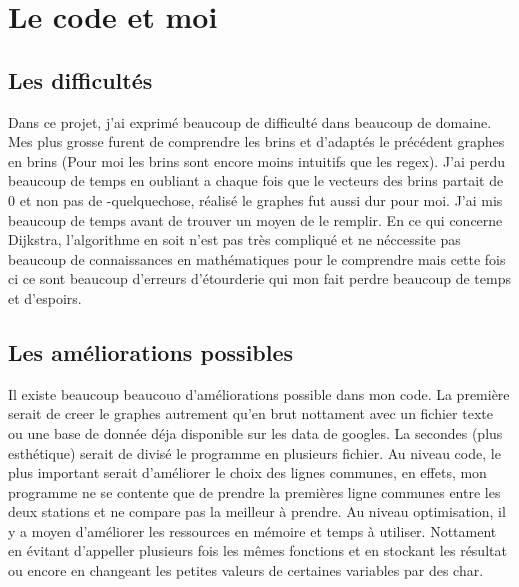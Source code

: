 \section{Le code et moi}
\subsection{Les difficultés}
Dans ce projet, j'ai exprimé beaucoup de difficulté dans beaucoup de domaine. Mes plus grosse furent de comprendre les brins et d'adaptés le précédent graphes en brins (Pour moi les brins sont encore moins intuitifs que les regex). J'ai perdu beaucoup de temps en oubliant a chaque fois que le vecteurs des brins partait de 0  et non pas de -quelquechose, réalisé le graphes fut aussi dur pour moi. J'ai mis beaucoup de temps avant de trouver un moyen de le remplir. En ce qui concerne Dijkstra, l'algorithme en soit n'est pas très compliqué et ne néccessite pas beaucoup de connaissances en mathématiques pour le comprendre mais cette fois ci ce sont beaucoup d'erreurs d'étourderie qui mon fait perdre beaucoup de temps et d'espoirs. 

\subsection{Les améliorations possibles}
Il existe beaucoup beaucouo d'améliorations possible dans mon code. La première serait de creer le graphes autrement qu'en brut nottament avec un fichier texte ou une base de donnée déja disponible sur les data de googles. La secondes (plus esthétique) serait de divisé le programme en plusieurs fichier. Au niveau code, le plus important serait d'améliorer le choix des lignes communes, en effets, mon programme ne se contente que de prendre la premières ligne communes entre les deux stations et ne compare pas la meilleur à prendre. Au niveau optimisation, il y a moyen d'améliorer les ressources en mémoire et temps à utiliser. Nottament en évitant d'appeller plusieurs fois les mêmes fonctions et en stockant les résultat ou encore en changeant les petites valeurs de certaines variables par des char.


